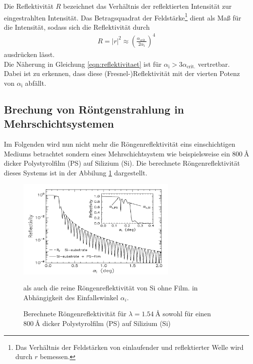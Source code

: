 Die Reflektivität $R$ bezeichnet das Verhältnis der reflektierten Intensität
zur eingestrahlten Intensität.
Das Betragsquadrat der
Feldstärke\footnote{Das Verhältnis der Feldstärken von einlaufender und
reflektierter Welle wird durch $r$ bemessen.} dient als Maß für die Intensität,
sodass sich die Reflektivität durch
\begin{align}
  R = \lvert r \rvert^{2} \approx
  \left( \frac{\alpha_{\text{crit.}}}{2\alpha_{\text{i}}} \right)^{4}
  \label{eqn:reflektivitaet}
\end{align}
ausdrücken lässt.\\
Die Näherung in Gleichung \eqref{eqn:reflektivitaet} ist für
$\alpha_{\text{i}} > 3\alpha_{\text{crit.}}$ vertretbar. Dabei ist zu erkennen,
dass diese (Fresnel-)Reflektivität mit der vierten Potenz von $\alpha_{\text{i}}$
abfällt.

\subsection{Brechung von Röntgenstrahlung in Mehrschichtsystemen}
\label{subsec:mehrschicht}
Im Folgenden wird nun nicht mehr
die Röngenreflektivität
eins einschichtigen
Mediums betrachtet sondern eines Mehrschichtsystem wie
beispielsweise ein $\SI{800}{\angstrom}$ dicker Polystyrolfilm (PS)
auf Silizium (Si). Die berechnete Röngenreflektivität dieses
Systems ist in der Abbilung \ref{fig:mehrschicht} dargestellt.

\begin{figure}
\centering
\includegraphics[width = 0.7\textwidth]{bilder/mehrschicht_beispiel.PNG}
\caption{Berechnete Röngenreflektivität für $\lambda=\SI{1.54}{\angstrom} $ sowohl
für einen $\SI{800}{\angstrom}$ dicker Polystyrolfilm (PS)
auf Silizium (Si)} als auch die reine Röngenreflektivität von Si ohne Film.
in Abhängigkeit des Einfallswinkel $\alpha_i$.\cite{sample}
\label{fig:mehrschicht}
\end{figure}

